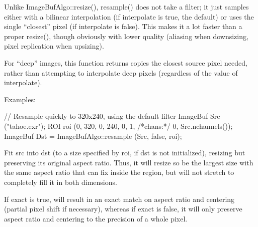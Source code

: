 Unlike {\cf ImageBufAlgo::resize()}, {\cf resample()} does not take a filter; it
just samples either with a bilinear interpolation (if {\cf interpolate} is
{\cf true}, the default) or uses the single ``closest'' pixel (if
{\cf interpolate} is {\cf false}).  This makes it a lot faster than a proper
{\cf resize()}, though obviously with lower quality (aliasing when
downsizing, pixel replication when upsizing).

For ``deep'' images, this function returns copies the closest source pixel
needed, rather than attempting to interpolate deep pixels (regardless of the
value of {\cf interpolate}).

\smallskip
\noindent Examples:
\begin{code}
    // Resample quickly to 320x240, using the default filter
    ImageBuf Src ("tahoe.exr");
    ROI roi (0, 320, 0, 240, 0, 1, /*chans:*/ 0, Src.nchannels());
    ImageBuf Dst = ImageBufAlgo::resample (Src, false, roi);
\end{code}
\apiend


 
\NEW %

Fit {\cf src} into {\cf dst} (to a size specified by {\cf roi}, if {\cf dst}
is not initialized), resizing but preserving its original aspect ratio.
Thus, it will resize so be the largest size with the same aspect ratio that
can fix inside the region, but will not stretch to completely fill it in
both dimensions.

If {\cf exact} is true, will result in an exact match on aspect ratio and
centering (partial pixel shift if necessary), whereas if {\cf exact} is
false, it will only preserve aspect ratio and centering to the precision of
a whole pixel.

